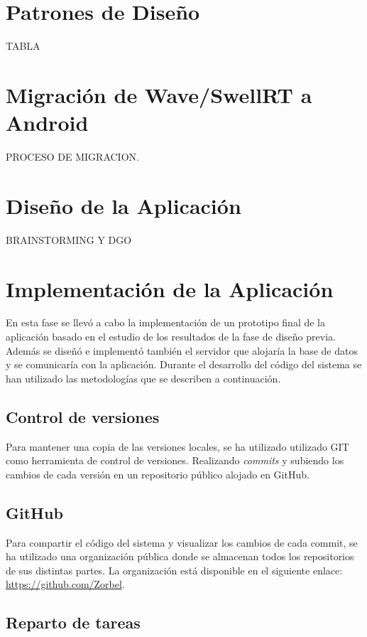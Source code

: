 \section{Patrones de Diseño}

TABLA

\section{Migración de Wave/SwellRT a Android}

PROCESO DE MIGRACION.

\section{Diseño de la Aplicación}

BRAINSTORMING Y DGO

\section{Implementación de la Aplicación}

En esta fase se llevó a cabo la implementación de un prototipo final de la aplicación basado en el estudio de los resultados de la fase de diseño previa. Además se diseñó e implementó también el servidor que alojaría la base de datos y se comunicaría con la aplicación. Durante el desarrollo del código del sistema se han utilizado las metodologías que se describen a continuación.

\subsection{Control de versiones}

Para mantener una copia de las versiones locales, se ha utilizado utilizado GIT como herramienta de control de versiones. Realizando \textit{commits} y subiendo los cambios de cada versión en un repositorio público alojado en GitHub.

\subsection{GitHub}

Para compartir el código del sistema y visualizar los cambios de cada commit, se ha utilizado una organización pública donde se almacenan todos los repositorios de sus distintas partes. La organización está disponible en el siguiente enlace: \url{https://github.com/Zorbel}.

\subsection{Reparto de tareas}

